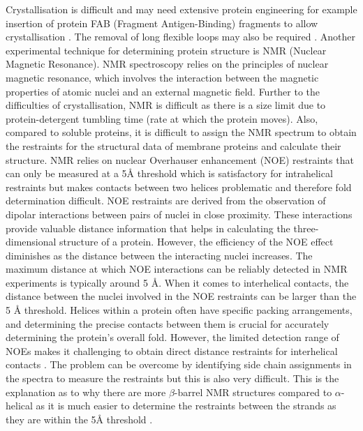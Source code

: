 Crystallisation is difficult and may need extensive protein engineering for example insertion of protein FAB (Fragment Antigen-Binding) fragments to allow crystallisation .  The removal of long flexible loops may also be required \cite{rosenbaum2007gpcr}.  Another experimental technique for determining protein structure is NMR (Nuclear Magnetic Resonance). NMR spectroscopy relies on the principles of nuclear magnetic resonance, which involves the interaction between the magnetic properties of atomic nuclei and an external magnetic field.  Further to the difficulties of crystallisation, NMR is difficult as there is a size limit due to protein-detergent tumbling time (rate at which the protein moves). Also, compared to soluble proteins, it is difficult to assign the NMR spectrum to obtain the restraints for the structural data of membrane proteins and calculate  their structure.  NMR relies on nuclear Overhauser enhancement (NOE) restraints that can only be measured at a 5{\AA} threshold which is satisfactory for intrahelical restraints but makes contacts between two helices problematic and therefore fold determination difficult.  NOE restraints are derived from the observation of dipolar interactions between pairs of nuclei in close proximity. These interactions provide valuable distance information that helps in calculating the three-dimensional structure of a protein. However, the efficiency of the NOE effect diminishes as the distance between the interacting nuclei increases. The maximum distance at which NOE interactions can be reliably detected in NMR experiments is typically around 5 {\AA}.  When it comes to interhelical contacts, the distance between the nuclei involved in the NOE restraints can be larger than the 5 {\AA} threshold. Helices within a protein often have specific packing arrangements, and determining the precise contacts between them is crucial for accurately determining the protein's overall fold. However, the limited detection range of NOEs makes it challenging to obtain direct distance restraints for interhelical contacts \cite{vogeli2014nuclear}. The problem can be overcome by identifying side chain assignments in the spectra to measure the restraints but this is also very difficult.  This is the explanation as to why there are more $\beta$-barrel NMR structures compared to $\alpha$-helical as it is much easier to determine the restraints between the strands as they are within the 5{\AA} threshold \cite{kaltschnee2016extraction}. 

